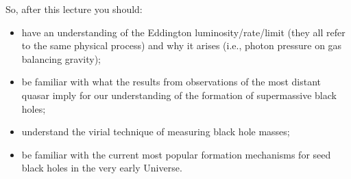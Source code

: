\documentclass[11pt]{article}
\begin{document}
So, after this lecture you should:
\begin{itemize}
\item have an understanding of the Eddington luminosity/rate/limit
  (they all refer to the same physical process) and why it arises
  (i.e., photon pressure on gas balancing gravity);
\item be familiar with what the results from observations of the most
  distant quasar imply for our understanding of the formation of
  supermassive black holes;
\item understand the virial technique of measuring black hole masses;
\item be familiar with the current most popular formation mechanisms
  for seed black holes in the very early Universe.
\end{itemize}
\end{document}
